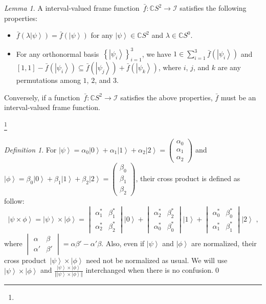 \documentclass{article}
\theoremstyle{remark}
\newtheorem{definition}{Definition}
\newtheorem{lemma}{Lemma}
\newcommand{\ket}[1]{{\left\vert{#1}\right\rangle}}
\newcommand{\yutsung}[1]{\fbox{\begin{minipage}{0.9\textwidth}\color{purple}{Yu-Tsung says: #1}\end{minipage}}}
\begin{document}
\begin{lemma}A interval-valued frame function~$\bar{f}:\mathbb{C}S^{2}\rightarrow\mathscr{I}$
satisfies the following properties:
\begin{itemize}
\item $\bar{f}\left(\lambda\ket{\psi}\right)=\bar{f}\left(\ket{\psi}\right)$
for any $\ket{\psi}\in\mathbb{C}S^{2}$ and $\lambda\in\mathbb{C}S^{0}$.
\item For any orthonormal basis~$\left\{ \ket{\psi_{i}}\right\} _{i=1}^{3}$,
we have $1\in\sum_{i=1}^{3}\bar{f}\left(\ket{\psi_{i}}\right)$ and
$\left[1,1\right]-\bar{f}\left(\ket{\psi_{i}}\right)\subseteq\bar{f}\left(\ket{\psi_{j}}\right)+\bar{f}\left(\ket{\psi_{k}}\right)$,
where $i$, $j$, and $k$ are any permutations among $1$, $2$,
and $3$.
\end{itemize}
Conversely, if a function~$\bar{f}:\mathbb{C}S^{2}\rightarrow\mathscr{I}$
satisfies the above properties, $\bar{f}$ must be an interval-valued
frame function.\end{lemma}\footnote{\yutsung{Verify the proof...}}

\begin{definition}For $\ket{\psi}=\alpha_{0}\ket{0}+\alpha_{1}\ket{1}+\alpha_{2}\ket{2}=\begin{pmatrix}\alpha_{0}\\
\alpha_{1}\\
\alpha_{2}
\end{pmatrix}$ and $\ket{\phi}=\beta_{0}\ket{0}+\beta_{1}\ket{1}+\beta_{2}\ket{2}=\begin{pmatrix}\beta_{0}\\
\beta_{1}\\
\beta_{2}
\end{pmatrix}$, their cross product is defined as follow: 
\[
\ket{\psi\times\phi}=\ket{\psi}\times\ket{\phi}=\begin{vmatrix}\alpha_{1}^{*} & \beta_{1}^{*}\\
\alpha_{2}^{*} & \beta_{2}^{*}
\end{vmatrix}\ket{0}+\begin{vmatrix}\alpha_{2}^{*} & \beta_{2}^{*}\\
\alpha_{0}^{*} & \beta_{0}^{*}
\end{vmatrix}\ket{1}+\begin{vmatrix}\alpha_{0}^{*} & \beta_{0}^{*}\\
\alpha_{1}^{*} & \beta_{1}^{*}
\end{vmatrix}\ket{2}\textrm{ ,}
\]
where $\begin{vmatrix}\alpha & \beta\\
\alpha' & \beta'
\end{vmatrix}=\alpha\beta'-\alpha'\beta$. Also, even if $\ket{\psi}$ and $\ket{\phi}$ are normalized, their
cross product~$\ket{\psi}\times\ket{\phi}$ need not be normalized
as usual. We will use $\ket{\psi}\times\ket{\phi}$ and $\frac{\ket{\psi}\times\ket{\phi}}{\left\Vert \ket{\psi}\times\ket{\phi}\right\Vert }$
interchanged when there is no confusion.\qed\end{definition}
\end{document}
